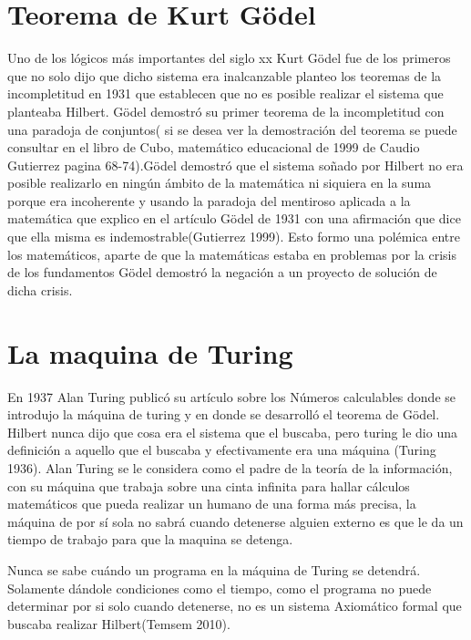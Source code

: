 \documentclass{article}
\begin{document}
\section{Teorema de Kurt Gödel}
Uno de los lógicos más importantes del siglo xx Kurt Gödel fue de los primeros que no solo dijo que dicho sistema era inalcanzable planteo los teoremas de la incompletitud en 1931 que establecen que no es posible realizar el sistema que planteaba Hilbert.
\vspace{10pt}
Gödel demostró su primer teorema de la incompletitud con una paradoja de conjuntos( si se desea ver la demostración del teorema se puede consultar en el libro de Cubo, matemático educacional de 1999 de Caudio Gutierrez pagina 68-74).Gödel demostró que el sistema soñado por Hilbert no era posible realizarlo en ningún ámbito de la matemática ni siquiera en la suma porque era incoherente y usando la paradoja  del mentiroso aplicada a la matemática que explico en el artículo Gödel de 1931 con una afirmación que dice que ella misma es indemostrable(Gutierrez  1999).
\vspace{10pt}
Esto formo una polémica entre los matemáticos, aparte de que la matemáticas estaba en problemas por la crisis de los fundamentos Gödel demostró la negación a un proyecto de solución de dicha crisis.

\section{La maquina de Turing}
En 1937 Alan Turing publicó su artículo sobre los Números calculables donde se introdujo la máquina de turing y en donde se desarrolló el teorema de Gödel. Hilbert nunca dijo que cosa era el sistema que el buscaba, pero turing le dio una definición a aquello que el buscaba y efectivamente era una máquina (Turing 1936).
Alan Turing se le considera como el padre de la teoría de la información, con su máquina que trabaja sobre una cinta infinita para hallar cálculos matemáticos que pueda realizar un humano de una forma más precisa, la máquina de por sí sola no sabrá cuando detenerse alguien externo es que le da un tiempo de trabajo para que la maquina se detenga.

\vspace{10pt}

Nunca se sabe cuándo un programa en la máquina de Turing se detendrá. Solamente dándole condiciones como el tiempo, como el programa no puede determinar por si solo cuando detenerse, no es un sistema Axiomático formal que buscaba realizar Hilbert(Temsem 2010).
\end{document}
